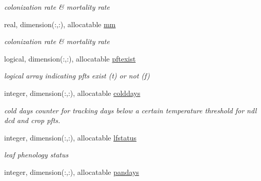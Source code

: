 \begin{DoxyCompactItemize}
\begin{DoxyCompactList}\small\item\em colonization rate \& mortality rate \end{DoxyCompactList}\item 
\hypertarget{structctem__statevars_1_1veg__gat_af01e93180c530d054b39d8cda85fc244}{}real, dimension(\+:,\+:), allocatable \hyperlink{structctem__statevars_1_1veg__gat_af01e93180c530d054b39d8cda85fc244}{mm}\label{structctem__statevars_1_1veg__gat_af01e93180c530d054b39d8cda85fc244}

\begin{DoxyCompactList}\small\item\em colonization rate \& mortality rate \end{DoxyCompactList}\item 
\hypertarget{structctem__statevars_1_1veg__gat_ac9d704a1e06056c439d16c811ec9d398}{}logical, dimension(\+:,\+:), allocatable \hyperlink{structctem__statevars_1_1veg__gat_ac9d704a1e06056c439d16c811ec9d398}{pftexist}\label{structctem__statevars_1_1veg__gat_ac9d704a1e06056c439d16c811ec9d398}

\begin{DoxyCompactList}\small\item\em logical array indicating pfts exist (t) or not (f) \end{DoxyCompactList}\item 
\hypertarget{structctem__statevars_1_1veg__gat_a9cde68139aa292c16c412ac9ecf9dd34}{}integer, dimension(\+:,\+:), allocatable \hyperlink{structctem__statevars_1_1veg__gat_a9cde68139aa292c16c412ac9ecf9dd34}{colddays}\label{structctem__statevars_1_1veg__gat_a9cde68139aa292c16c412ac9ecf9dd34}

\begin{DoxyCompactList}\small\item\em cold days counter for tracking days below a certain temperature threshold for ndl dcd and crop pfts. \end{DoxyCompactList}\item 
\hypertarget{structctem__statevars_1_1veg__gat_a049661941e7cc95ee7aef84631864bfe}{}integer, dimension(\+:,\+:), allocatable \hyperlink{structctem__statevars_1_1veg__gat_a049661941e7cc95ee7aef84631864bfe}{lfstatus}\label{structctem__statevars_1_1veg__gat_a049661941e7cc95ee7aef84631864bfe}

\begin{DoxyCompactList}\small\item\em leaf phenology status \end{DoxyCompactList}\item 
\hypertarget{structctem__statevars_1_1veg__gat_a4a1259f16b017a5656e9e067f0db96e3}{}integer, dimension(\+:,\+:), allocatable \hyperlink{structctem__statevars_1_1veg__gat_a4a1259f16b017a5656e9e067f0db96e3}{pandays}\label{structctem__statevars_1_1veg__gat_a4a1259f16b017a5656e9e067f0db96e3}


\end{DoxyCompactItemize}
